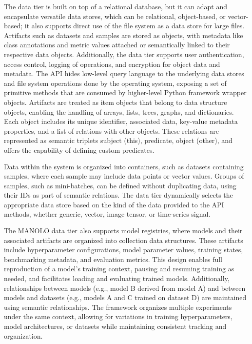 The data tier is built on top of a relational database, but it can adapt and encapsulate versatile data stores, which can be relational, object-based, or vector-based; it also supports direct use of the file system as a data store  for large files. Artifacts such as datasets and samples are stored as objects, with metadata like class annotations and metric values attached or semantically linked to their respective data objects. Additionally, the data tier supports user authentication, access control, logging of operations, and encryption for object data and metadata. The API hides low-level query language to the underlying data stores and file system operations done by the operating system, exposing a set of primitive methods that are consumed by higher-level Python framework wrapper objects. Artifacts are treated as item objects that belong to data structure objects, enabling the handling of arrays, lists, trees, graphs, and dictionaries. Each object includes its unique identifier, associated data, key-value metadata properties, and a list of relations with other objects. These relations are represented as semantic triplets {subject (this), predicate, object (other)}, and offers the capability of defining custom predicates.

Data within the system is organized into containers, such as datasets containing samples, where each sample may include data points or vector values. Groups of samples, such as mini-batches, can be defined without duplicating data, using their IDs as part of semantic relations. The data tier dynamically selects the appropriate data store based on the kind of the data provided to the API methods, whether generic, vector, image tensor, or time-series signal.

The MANOLO data tier also supports model registries, where models and their associated artifacts are organized into collection data structures. These artifacts include hyperparameter configurations, model parameter values, training states, benchmarking metadata, and evaluation metrics. This design enables full reproduction of a model’s training context, pausing and resuming training as needed, and facilitates loading and evaluating trained models. Additionally, relationships between models (e.g., model B derived from model A) and between models and datasets (e.g., models A and C trained on dataset D) are maintained using semantic relationships. The framework organizes multiple experiments under the same context, allowing for variations in training hyperparameters, model architectures, or datasets while maintaining consistent tracking and organization.


